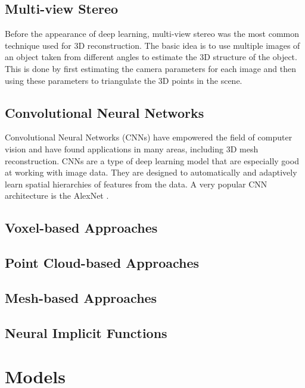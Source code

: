 \subsection{Multi-view Stereo}
Before the appearance of deep learning, multi-view stereo was the most common technique used for 3D reconstruction.
The basic idea is to use multiple images of an object taken from different angles to estimate the 3D structure of the object.
This is done by first estimating the camera parameters for each image and then using these parameters to triangulate the 3D points in the scene.
\textcite{furukawa_accurate_2010}

\subsection{Convolutional Neural Networks}
Convolutional Neural Networks (CNNs) have empowered the field of computer vision and have found applications in many areas, including 3D mesh reconstruction.
CNNs are a type of deep learning model that are especially good at working with image data. They are designed to automatically and adaptively learn spatial hierarchies of features from the data.
A very popular CNN architecture is the AlexNet \autocite{krizhevsky_imagenet_2012}.
\textcite{krizhevsky_imagenet_2012}

\subsection{Voxel-based Approaches}
\textcite{zhirong_wu_3d_2015}

\subsection{Point Cloud-based Approaches}
\textcite{charles_pointnet_2017}
\subsection{Mesh-based Approaches}
\textcite{wang_pixel2mesh_2018}
\subsection{Neural Implicit Functions}

\textcite{park_deepsdf_2019}
\textcite{mildenhall_nerf_2021}

\section{Models}


